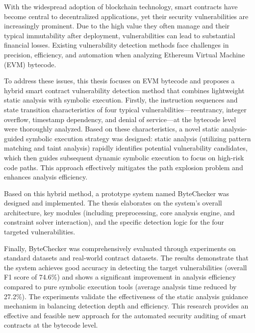 \documentclass[print, master, vlined, timesmath]{DissertUESTC}
\begin{document}
\enabstract
With the widespread adoption of blockchain technology, smart contracts have become central to decentralized applications, yet their security vulnerabilities are increasingly prominent. Due to the high value they often manage and their typical immutability after deployment, vulnerabilities can lead to substantial financial losses. Existing vulnerability detection methods face challenges in precision, efficiency, and automation when analyzing Ethereum Virtual Machine (EVM) bytecode.

To address these issues, this thesis focuses on EVM bytecode and proposes a hybrid smart contract vulnerability detection method that combines lightweight static analysis with symbolic execution. Firstly, the instruction sequences and state transition characteristics of four typical vulnerabilities—reentrancy, integer overflow, timestamp dependency, and denial of service—at the bytecode level were thoroughly analyzed. Based on these characteristics, a novel static analysis-guided symbolic execution strategy was designed: static analysis (utilizing pattern matching and taint analysis) rapidly identifies potential vulnerability candidates, which then guides subsequent dynamic symbolic execution to focus on high-risk code paths. This approach effectively mitigates the path explosion problem and enhances analysis efficiency.

Based on this hybrid method, a prototype system named ByteChecker was designed and implemented. The thesis elaborates on the system's overall architecture, key modules (including preprocessing, core analysis engine, and constraint solver interaction), and the specific detection logic for the four targeted vulnerabilities.

Finally, ByteChecker was comprehensively evaluated through experiments on standard datasets and real-world contract datasets. The results demonstrate that the system achieves good accuracy in detecting the target vulnerabilities (overall F1 score of 74.6\%) and shows a significant improvement in analysis efficiency compared to pure symbolic execution tools (average analysis time reduced by 27.2\%). The experiments validate the effectiveness of the static analysis guidance mechanism in balancing detection depth and efficiency. This research provides an effective and feasible new approach for the automated security auditing of smart contracts at the bytecode level.

\end{document}
